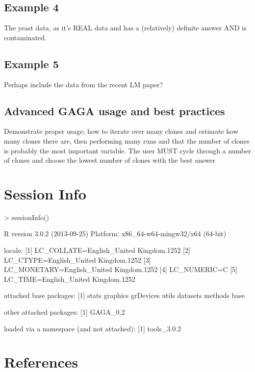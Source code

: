 \documentclass{article}
\begin{document}
\subsection{Example 4}
The yeast data, as it's REAL data and has a (relatively) definite answer AND is contaminated.
\subsection{Example 5}
Perhaps include the data from the recent LM paper?
\subsection{Advanced GAGA usage and best practices}
Demonstrate proper usage; how to iterate over many clones and estimate how many clones there are, then performing many runs
 and that the number of clones is probably the most important variable.  The user MUST cycle through a number of clones and choose the lowest number of clones with the best answer

\section{Session Info}
\begin{Schunk}
\begin{Sinput}
> sessionInfo()
\end{Sinput}
\begin{Soutput}
R version 3.0.2 (2013-09-25)
Platform: x86_64-w64-mingw32/x64 (64-bit)

locale:
[1] LC_COLLATE=English_United Kingdom.1252 
[2] LC_CTYPE=English_United Kingdom.1252   
[3] LC_MONETARY=English_United Kingdom.1252
[4] LC_NUMERIC=C                           
[5] LC_TIME=English_United Kingdom.1252    

attached base packages:
[1] stats     graphics  grDevices utils     datasets  methods   base     

other attached packages:
[1] GAGA_0.2

loaded via a namespace (and not attached):
[1] tools_3.0.2
\end{Soutput}
\end{Schunk}

\section{References}
\end{document}
